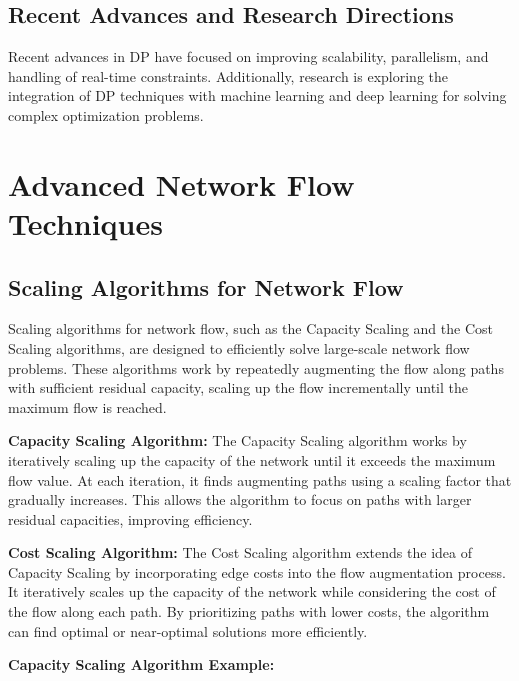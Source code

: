 \documentclass[12pt]{book} %
\begin{document}
\subsection{Recent Advances and Research Directions}

Recent advances in DP have focused on improving scalability, parallelism, and handling of real-time constraints. Additionally, research is exploring the integration of DP techniques with machine learning and deep learning for solving complex optimization problems.


\section{Advanced Network Flow Techniques}

\subsection{Scaling Algorithms for Network Flow}

Scaling algorithms for network flow, such as the Capacity Scaling and the Cost Scaling algorithms, are designed to efficiently solve large-scale network flow problems. These algorithms work by repeatedly augmenting the flow along paths with sufficient residual capacity, scaling up the flow incrementally until the maximum flow is reached.

\textbf{Capacity Scaling Algorithm:}
The Capacity Scaling algorithm works by iteratively scaling up the capacity of the network until it exceeds the maximum flow value. At each iteration, it finds augmenting paths using a scaling factor that gradually increases. This allows the algorithm to focus on paths with larger residual capacities, improving efficiency.

\textbf{Cost Scaling Algorithm:}
The Cost Scaling algorithm extends the idea of Capacity Scaling by incorporating edge costs into the flow augmentation process. It iteratively scales up the capacity of the network while considering the cost of the flow along each path. By prioritizing paths with lower costs, the algorithm can find optimal or near-optimal solutions more efficiently.

\textbf{Capacity Scaling Algorithm Example:}
\end{document}
